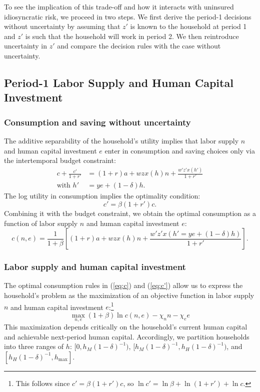 \documentclass[12pt,english]{article}
\numberwithin{equation}{section}
\begin{document}
To see the implication of this trade-off and how it interacts with uninsured idiosyncratic risk, we proceed in two steps. We first derive the period-1 decisions without uncertainty by assuming that $z'$ is known to the household at period 1 and $z'$ is such that the household will work in period 2. We then reintroduce uncertainty in $z'$ and compare the decision rules with the case without uncertainty.


\subsection{Period-1 Labor Supply and Human Capital Investment} 
\subsubsection{Consumption and saving without uncertainty}

The additive separability of the household's utility implies that labor supply $n$ and human capital investment $e$ enter in consumption and saving choices only via the intertemporal budget constraint:
\begin{align*}
    c + \frac{c'}{1+r'}&=(1+r)a+wzx(h)n+\frac{w'z'x(h')}{1+r'} \\
    \text{with } h'&=ye+ (1-\delta)h.
\end{align*}
The log utility in consumption implies the optimality condition:
\begin{equation}\label{eq:c'}
     c'=\beta(1+r')c.
\end{equation}
Combining it with the budget constraint, we obtain the optimal consumption as a function of labor supply $n$ and human capital investment $e$:
\begin{equation}\label{eq:c}
    c(n,e)=\frac{1}{1+\beta}\left[(1+r)a+wzx(h)n+\frac{w'z'x\left(h'=ye+ (1-\delta)h\right)}{1+r'} \right].
\end{equation}

\subsubsection{Labor supply and human capital investment}\label{sec:n_and_e}

The optimal consumption rules in (\ref{eq:c}) and (\ref{eq:c'}) allow us to express the household’s problem as the maximization of an objective function in labor supply $n$ and human capital investment $e$:\footnote{This follows since $c' = \beta(1+r')c$, so $\ln c' = \ln\beta + \ln(1+r') + \ln c$.} 
\begin{equation}
   \max_{n,e} (1+\beta)\ln c(n,e) - \chi_n n - \chi_e e
\end{equation}
This maximization depends critically on the household's current human capital and achievable next-period human capital. Accordingly, we partition households into three ranges of $h$: $[0,h_M(1-\delta)^{-1})$, $[h_M(1-\delta)^{-1},h_H(1-\delta)^{-1})$, and $[h_H(1-\delta)^{-1},h_{\max}]$. 
\end{document}
